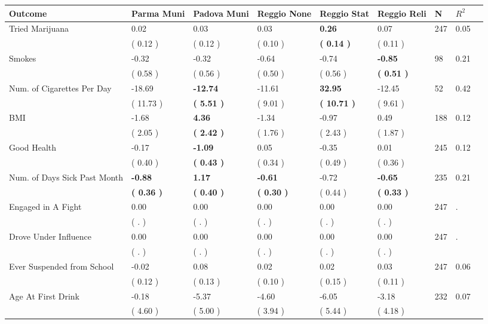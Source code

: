 \begin{tabular}{L{6.2cm} C{1.8cm} C{1.8cm} C{1.8cm} C{1.8cm} C{1.8cm} C{1.8cm} C{0.3cm} C{0.3cm}}
\toprule
 \textbf{Outcome} & \textbf{Parma Muni} & \textbf{Padova Muni} & \textbf{Reggio None} & \textbf{Reggio Stat} & \textbf{Reggio Reli} & \textbf{N} & \textbf{$ R^2$} \\
\midrule
Tried Marijuana &      0.02 &      0.03 &      0.03 & \textbf{     0.26} &      0.07  & 247 &       0.05 \\ 
 & (     0.12 ) & (     0.12 ) & (     0.10 ) & \textbf{(     0.14 )} & (     0.11 )  & \\
Smokes &     -0.32 &     -0.32 &     -0.64 &     -0.74 & \textbf{    -0.85}  & 98 &       0.21 \\ 
 & (     0.58 ) & (     0.56 ) & (     0.50 ) & (     0.56 ) & \textbf{(     0.51 )}  & \\
Num. of Cigarettes Per Day &    -18.69 & \textbf{   -12.74} &    -11.61 & \textbf{    32.95} &    -12.45  & 52 &       0.42 \\ 
 & (    11.73 ) & \textbf{(     5.51 )} & (     9.01 ) & \textbf{(    10.71 )} & (     9.61 )  & \\
BMI &     -1.68 & \textbf{     4.36} &     -1.34 &     -0.97 &      0.49  & 188 &       0.12 \\ 
 & (     2.05 ) & \textbf{(     2.42 )} & (     1.76 ) & (     2.43 ) & (     1.87 )  & \\
Good Health &     -0.17 & \textbf{    -1.09} &      0.05 &     -0.35 &      0.01  & 245 &       0.12 \\ 
 & (     0.40 ) & \textbf{(     0.43 )} & (     0.34 ) & (     0.49 ) & (     0.36 )  & \\
Num. of Days Sick Past Month & \textbf{    -0.88} & \textbf{     1.17} & \textbf{    -0.61} &     -0.72 & \textbf{    -0.65}  & 235 &       0.21 \\ 
 & \textbf{(     0.36 )} & \textbf{(     0.40 )} & \textbf{(     0.30 )} & (     0.44 ) & \textbf{(     0.33 )}  & \\
Engaged in A Fight &      0.00 &      0.00 &      0.00 &      0.00 &      0.00  & 247 &          . \\ 
 & (        . ) & (        . ) & (        . ) & (        . ) & (        . )  & \\
Drove Under Influence &      0.00 &      0.00 &      0.00 &      0.00 &      0.00  & 247 &          . \\ 
 & (        . ) & (        . ) & (        . ) & (        . ) & (        . )  & \\
Ever Suspended from School &     -0.02 &      0.08 &      0.02 &      0.02 &      0.03  & 247 &       0.06 \\ 
 & (     0.12 ) & (     0.13 ) & (     0.10 ) & (     0.15 ) & (     0.11 )  & \\
Age At First Drink &     -0.18 &     -5.37 &     -4.60 &     -6.05 &     -3.18  & 232 &       0.07 \\ 
 & (     4.60 ) & (     5.00 ) & (     3.94 ) & (     5.44 ) & (     4.18 )  & \\
\bottomrule
\end{tabular}
